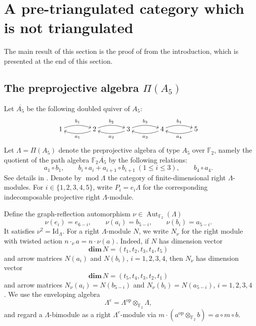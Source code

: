 \documentclass[a4paper,reqno,10pt]{amsart}
\numberwithin{equation}{section}
\DeclareMathOperator{\modu}{mod}
\newcommand{\kk}{\mathbb F_2}
\newcommand{\Lam}{\Lambda}
\begin{document}
\section{A pre-triangulated category which is not triangulated}
\label{sec:example}
The main result of this section is the proof of  from the introduction, which is presented at the end of this section.
\subsection{The preprojective algebra \texorpdfstring{$\Pi(A_5)$}{Pi(A5)}}
\label{sec:algebra}

Let $\overline{A_5}$ be the following
doubled quiver of $A_5$: 
\[
\xymatrix@C=38pt{
1\ar@/^/[r]^{b_1}&
2\ar@/^/[l]^{a_1}\ar@/^/[r]^{b_2}&
3\ar@/^/[l]^{a_2}\ar@/^/[r]^{b_3}&
4\ar@/^/[l]^{a_3}\ar@/^/[r]^{b_4}&
5\ar@/^/[l]^{a_4}
}
\]
Let $\Lambda=\Pi(A_5)$ denote the preprojective algebra of type $A_5$ over $\mathbb F_2$, namely the quotient of the path algebra $\mathbb F_2 \overline{A_5}$ by the following relations:
\begin{equation}\label{eq:preproj-relations}
 a_1\circ b_1,\qquad
 b_i\circ a_i+a_{i+1}\circ b_{i+1}\ (1\le i\le3),\qquad
 b_4\circ a_4.
\end{equation}
See details in \cite[p.~158]{GelfandPonomarev1979}. Denote by $\modu \Lambda$ the category of finite-dimensional right $\Lambda$-modules. For $i\in\{1,2,3,4,5\}$, write $P_i=e_i\Lam$ for the corresponding indecomposable projective right $\Lam$-module.

Define the graph-reflection automorphism $\nu\in \operatorname{Aut}_{\kk}(\Lam)$
\begin{equation}\label{eq:nu}
 \nu(e_i)=e_{6-i},\qquad
 \nu(a_i)=b_{5-i},\qquad
 \nu(b_i)=a_{5-i}.
\end{equation}
It satisfies $\nu^2=\mathrm{Id}_\Lam$. For a right $\Lam$-module $N$, we write $N_\nu$ for the right module with twisted action
$n\mathbin{\cdot_\nu}a=n\cdot\nu(a)$. Indeed, if $N$ has dimension vector
\[
 \mathbf{dim}\,N=(t_1,t_2,t_3,t_4,t_5)
\]
and arrow matrices $N(a_i)$ and $N(b_i)$, $i=1,2,3,4$, then $N_\nu$ has dimension vector
\[
 \mathbf{dim}\,N=(t_5,t_4,t_3,t_2,t_1)
\]
and arrow matrices $N_\nu(a_i)=N(b_{5-i})$ and $N_\nu(b_i)=N(a_{5-i})$, $i=1,2,3,4$. We use the enveloping algebra
\[
 \Lam^e=\Lam^{\mathrm{op}}\otimes_{\kk}\Lam,
\]
and regard a $\Lam$-bimodule as a right $\Lam^e$-module via
$m\cdot(a^{\mathrm{op}}\otimes_{\kk} b)=a\circ m\circ b$.

\end{document}
